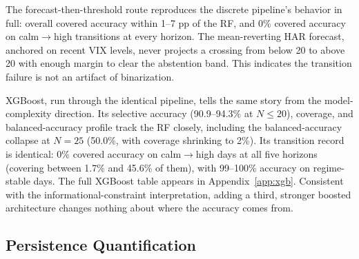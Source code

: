 \documentclass[12pt]{article}
\begin{document}
\begin{table}[H]
\centering
\caption{Forecast-then-threshold HAR benchmark vs.\ RF selective accuracy, and its
calm$\to$high transition record. Accuracies on covered test days; the abstention band $d$ is
calibrated on the training window.}
\label{tab:har_threshold}
\end{table}

The forecast-then-threshold route reproduces the discrete pipeline's behavior in full: overall
covered accuracy within 1--7 pp of the RF, and 0\% covered accuracy on calm$\to$high
transitions at every horizon. The mean-reverting HAR forecast, anchored on recent VIX levels,
never projects a crossing from below 20 to above 20 with enough margin to clear the abstention
band. This indicates the transition failure is not an artifact of binarization.

XGBoost, run through the identical pipeline, tells the same story from the model-complexity
direction. Its selective accuracy (90.9--94.3\% at $N \leq 20$), coverage, and balanced-accuracy
profile track the RF closely, including the balanced-accuracy collapse at $N = 25$ (50.0\%,
with coverage shrinking to 2\%). Its transition record is identical: 0\% covered accuracy on
calm$\to$high days at all five horizons (covering between 1.7\% and 45.6\% of them), with
99--100\% accuracy on regime-stable days. The full XGBoost table appears in
Appendix~\ref{app:xgb}. Consistent with the informational-constraint interpretation, adding a
third, stronger boosted architecture changes nothing about where the accuracy comes from.

\subsection{Persistence Quantification}
\label{sec:persist_quant}
\end{document}

